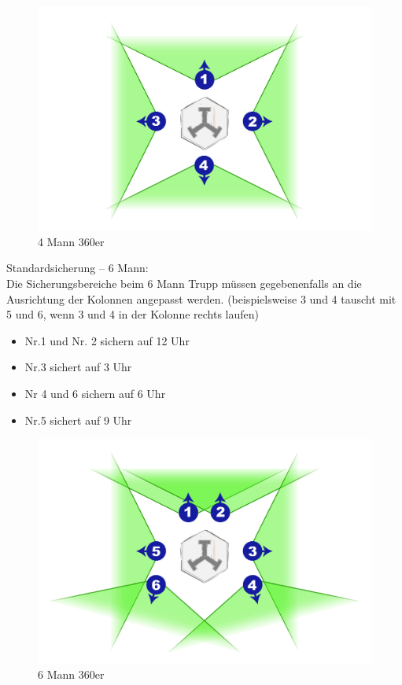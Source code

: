 		\begin{figure}[htbp]
			\centering
			\includegraphics[width=0.8\linewidth]{./img/grundlagen/sicherungen/360grad_sicherung_4mann.jpg}
			\caption{4 Mann 360er}
		\end{figure}
		\newpage
	Standardsicherung – 6 Mann:\\
		Die Sicherungsbereiche beim 6 Mann Trupp müssen gegebenenfalls an die Ausrichtung der Kolonnen angepasst werden. (beispielsweise 3 und 4 tauscht mit 5 und 6, wenn 3 und 4 in der Kolonne rechts laufen) 
		\begin{itemize}
			\item Nr.1 und Nr. 2 sichern auf 12 Uhr 
			\item Nr.3 sichert auf 3 Uhr 
			\item Nr 4 und 6 sichern auf 6 Uhr
			\item Nr.5 sichert auf 9 Uhr
			
		\end{itemize}

		\begin{figure}[htbp]
			\centering
			\includegraphics[width=0.8\linewidth]{./img/grundlagen/sicherungen/360grad_sicherung_6mann.jpg}	
			\caption{6 Mann 360er}
		\end{figure}
		

